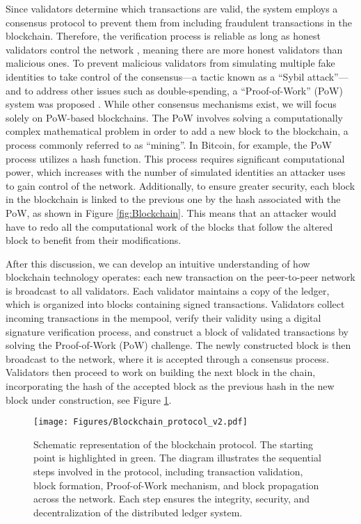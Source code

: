 \documentclass[nofootinbib,aps,prd,reprint,superscriptaddress,floatfix]{revtex4-2}
\begin{document}
Since validators determine which transactions are valid, the system employs a consensus protocol to prevent them from including fraudulent transactions in the blockchain. Therefore, the verification process is reliable as long as honest validators control the network \cite{Bitcoin_nakamoto}, meaning there are more honest validators than malicious ones. To prevent malicious validators from simulating multiple fake identities to take control of the consensus—a tactic known as a ``Sybil attack''—and to address other issues such as double-spending, a ``Proof-of-Work'' (PoW) system was proposed \cite{Bitcoin_nakamoto}. While other consensus mechanisms exist, we will focus solely on PoW-based blockchains. The PoW involves solving a computationally complex mathematical problem in order to add a new block to the blockchain, a process commonly referred to as ``mining''. In Bitcoin, for example, the PoW process utilizes a hash function. This process requires significant computational power, which increases with the number of simulated identities an attacker uses to gain control of the network. Additionally, to ensure greater security, each block in the blockchain is linked to the previous one by the hash associated with the PoW, as shown in Figure \ref{fig:Blockchain}. This means that an attacker would have to redo all the computational work of the blocks that follow the altered block to benefit from their modifications. 

After this discussion, we can develop an intuitive understanding of how blockchain technology operates: each new transaction on the peer-to-peer network is broadcast to all validators. Each validator maintains a copy of the ledger, which is organized into blocks containing signed transactions. Validators collect incoming transactions in the mempool, verify their validity using a digital signature verification process, and construct a block of validated transactions by solving the Proof-of-Work (PoW) challenge. The newly constructed block is then broadcast to the network, where it is accepted through a consensus process. Validators then proceed to work on building the next block in the chain, incorporating the hash of the accepted block as the previous hash in the new block under construction, see Figure \ref{fig:Blockchain_protocol}.

\begin{figure}[hbtp]
    \centering
    \texttt{[image: Figures/Blockchain\_protocol\_v2.pdf]}
    \caption{Schematic representation of the blockchain protocol. The starting point is highlighted in green. The diagram illustrates the sequential steps involved in the protocol, including transaction validation, block formation, Proof-of-Work mechanism, and block propagation across the network. Each step ensures the integrity, security, and decentralization of the distributed ledger system.}
    \label{fig:Blockchain_protocol}
\end{figure}
\end{document}
